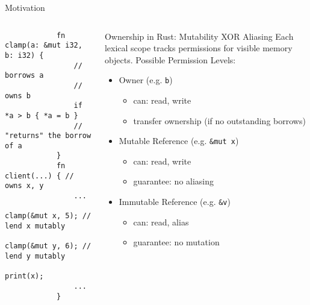 \documentclass{sdqbeamer}
\newcommand{\code}[1]{\texttt{#1}}
\begin{document}
\begin{frame}[fragile]{Motivation}{}
	\begin{columns}
		\begin{verbatim}
			fn  clamp(a: &mut i32, b: i32) { 
				// borrows a
				// owns b
				if *a > b { *a = b }
				// "returns" the borrow of a
			}
			fn  client(...) { // owns x, y
				...
				clamp(&mut x, 5); // lend x mutably
				clamp(&mut y, 6); // lend y mutably
				print(x);
				...
			}
		\end{verbatim}

		\begin{greenblock}{Ownership in Rust: Mutability XOR Aliasing}
			Each lexical scope tracks permissions for visible memory objects.
			Possible Permission Levels:
			\begin{itemize}
				\item Owner (e.g. \code{b})
					\begin{itemize}
						\item can: read, write
						\item transfer ownership (if no outstanding borrows)
					\end{itemize}
				\item Mutable Reference (e.g. \code{\&mut x})
					\begin{itemize}
						\item can: read, write
						\item guarantee: no aliasing
					\end{itemize}
				\item Immutable Reference (e.g. \code{\&v})
					\begin{itemize}
						\item can: read, alias
						\item guarantee: no mutation
					\end{itemize}
			\end{itemize}
		\end{greenblock}
	\end{columns}
	\note{
		- 
	}
\end{frame}
\end{document}
